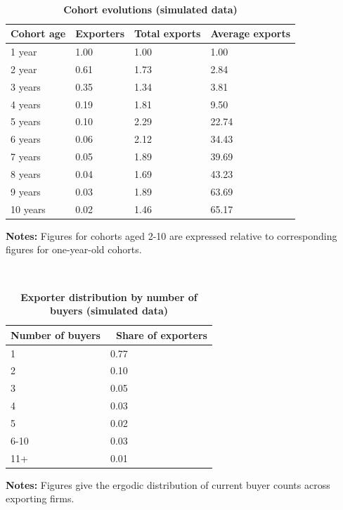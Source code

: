 \documentclass[12pt]{article}
\begin{document}
\begin{table}[tbp]
\caption{\textbf{Cohort evolutions (simulated data)}}\centering
{\small \ }
\par
{\small 
\begin{tabular}{llll}
\hline\hline
Cohort age & Exporters & Total exports & Average exports \\ \hline
1 year & 1.00 & 1.00 & 1.00 \\ 
2 year & 0.61 & 1.73 & 2.84 \\ 
3 years & 0.35 & 1.34 & 3.81 \\ 
4 years & 0.19 & 1.81 & 9.50 \\ 
5 years & 0.10 & 2.29 & 22.74 \\ 
6 years & 0.06 & 2.12 & 34.43 \\ 
7 years & 0.05 & 1.89 & 39.69 \\ 
8 years & 0.04 & 1.69 & 43.23 \\ 
9 years & 0.03 & 1.89 & 63.69 \\ 
10 years & 0.02 & 1.46 & 65.17 \\ \hline
\end{tabular}
}
\par
{\endcenter
\begin{tablenotes}
\item \textbf{Notes:} Figures for cohorts aged 2-10 are expressed relative to corresponding figures for one-year-old cohorts.
\end{tablenotes}
}
\label{tab:brooks_compare}
\end{table}


\begin{table}[tbp]
\caption{\textbf{Exporter distribution by number of buyers (simulated data)}}
\centering
{\small \ }
\par
{\small %
}
\par
{\small 
\begin{tabular}{ll}
\hline\hline
Number of buyers & \ Share of exporters \\ \hline
1 & 0.77 \\ 
2 & 0.10 \\ 
3 & 0.05 \\ 
4 & 0.03 \\ 
5 & 0.02 \\ 
6-10 & 0.03 \\ 
11+ & 0.01 \\ \hline
\end{tabular}
}
\par
{\endcenter%
\begin{tablenotes}
\item \textbf{Notes:} Figures give the ergodic distribution of current buyer counts across exporting firms.
\end{tablenotes}} %
\label{tab:client_dist_compare}
\end{table}
\end{document}
